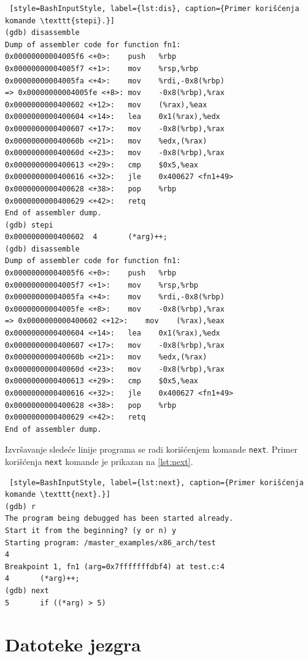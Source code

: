 \documentclass[12pt,oneside]{memoir}
\begin{document}
\begin{description}
\begin{lstlisting} [style=BashInputStyle, label={lst:dis}, caption={Primer korišćenja komande \texttt{stepi}.}]
(gdb) disassemble
Dump of assembler code for function fn1:
0x00000000004005f6 <+0>:	push   %rbp
0x00000000004005f7 <+1>:	mov    %rsp,%rbp
0x00000000004005fa <+4>:	mov    %rdi,-0x8(%rbp)
=> 0x00000000004005fe <+8>:	mov    -0x8(%rbp),%rax
0x0000000000400602 <+12>:	mov    (%rax),%eax
0x0000000000400604 <+14>:	lea    0x1(%rax),%edx
0x0000000000400607 <+17>:	mov    -0x8(%rbp),%rax
0x000000000040060b <+21>:	mov    %edx,(%rax)
0x000000000040060d <+23>:	mov    -0x8(%rbp),%rax
0x0000000000400613 <+29>:	cmp    $0x5,%eax
0x0000000000400616 <+32>:	jle    0x400627 <fn1+49>
0x0000000000400628 <+38>:	pop    %rbp
0x0000000000400629 <+42>:	retq   
End of assembler dump.
(gdb) stepi
0x0000000000400602	4		(*arg)++;
(gdb) disassemble 
Dump of assembler code for function fn1:
0x00000000004005f6 <+0>:	push   %rbp
0x00000000004005f7 <+1>:	mov    %rsp,%rbp
0x00000000004005fa <+4>:	mov    %rdi,-0x8(%rbp)
0x00000000004005fe <+8>:	mov    -0x8(%rbp),%rax
=> 0x0000000000400602 <+12>:	mov    (%rax),%eax
0x0000000000400604 <+14>:	lea    0x1(%rax),%edx
0x0000000000400607 <+17>:	mov    -0x8(%rbp),%rax
0x000000000040060b <+21>:	mov    %edx,(%rax)
0x000000000040060d <+23>:	mov    -0x8(%rbp),%rax
0x0000000000400613 <+29>:	cmp    $0x5,%eax
0x0000000000400616 <+32>:	jle    0x400627 <fn1+49>
0x0000000000400628 <+38>:	pop    %rbp
0x0000000000400629 <+42>:	retq   
End of assembler dump.
\end{lstlisting}

Izvršavanje sledeće linije programa se radi korišćenjem komande \texttt{next}. Primer korišćenja \texttt{next} komande je prikazan na \ref{lst:next}.

\begin{lstlisting} [style=BashInputStyle, label={lst:next}, caption={Primer korišćenja komande \texttt{next}.}]
(gdb) r
The program being debugged has been started already.
Start it from the beginning? (y or n) y
Starting program: /master_examples/x86_arch/test 
4
Breakpoint 1, fn1 (arg=0x7fffffffdbf4) at test.c:4
4		(*arg)++;
(gdb) next
5	    if ((*arg) > 5)
\end{lstlisting}

\end{description}


\section{Datoteke jezgra}
\end{document}
